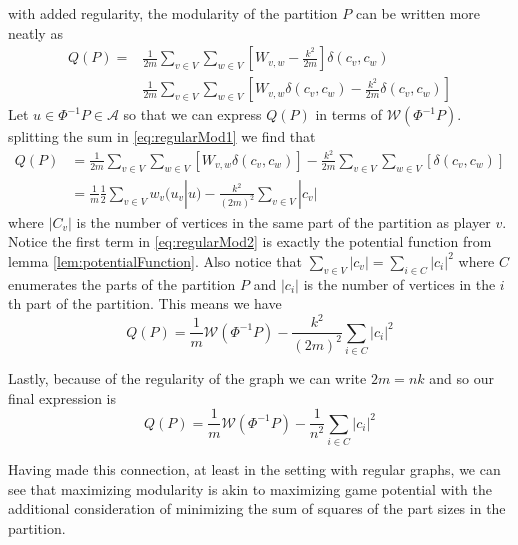 \documentclass{article}
\begin{document}
with added regularity, the modularity of the partition $P$ can be written more neatly as
\begin{equation}\label{eq:regularMod1}
    \begin{split}
    Q(P)=&\frac{1}{2m}{\sum_{v\in V}\sum_{w\in V}\left[W_{v,w}-\frac{k^2}{2m}\right]}\delta(c_v,c_w)\\
    &\frac{1}{2m}{\sum_{v\in V}\sum_{w\in V}\left[W_{v,w}\delta(c_v,c_w)-\frac{k^2}{2m}\delta(c_v,c_w)\right]}
    \end{split}
\end{equation}
Let $u\in \Phi^{-1}P\in \mathcal{A}$ so that we can express $Q(P)$ in terms of $\mathcal{W}(\Phi^{-1}P)$.
splitting the sum in \eqref{eq:regularMod1} we find that 
\begin{equation}\label{eq:regularMod2}
    \begin{split}
        Q(P)&=\frac{1}{2m}{\sum_{v\in V}\sum_{w\in V}\left[W_{v,w}\delta(c_v,c_w)\right]-\frac{k^2}{2m}\sum_{v\in V}\sum_{w\in V}\left[\delta(c_v,c_w)\right]}\\
        &=\frac{1}{m}\frac{1}{2}\sum_{v\in V}w_v(u_v|u)-\frac{k^2}{(2m)^2}\sum_{v\in V}|c_v|
    \end{split}
\end{equation}
where $|C_v|$ is the number of vertices in the same part of the partition as player $v$. Notice the first term in \eqref{eq:regularMod2} is exactly the potential function from lemma \ref{lem:potentialFunction}. Also notice that $\sum_{v\in V}|c_v|=\sum_{i\in C}|c_i|^2$ where $C$ enumerates the parts of the partition $P$ and $|c_i|$ is the number of vertices in the $i$th part of the partition. This means we have
\[
    Q(P)=\frac{1}{m}\mathcal{W}(\Phi^{-1}P)-\frac{k^2}{(2m)^2}\sum_{i\in C}|c_i|^2\]

Lastly, because of the regularity of the graph we can write $2m=nk$ and so our final expression is 
\begin{equation}
    Q(P)=\frac{1}{m}\mathcal{W}(\Phi^{-1}P)-\frac{1}{n^2}\sum_{i\in C}{|c_i|^2}
\end{equation}


Having made this connection, at least in the setting with regular graphs, we can see that maximizing modularity is akin to maximizing game potential with the additional consideration of minimizing the sum of squares of the part sizes in the partition. 
\end{document}
